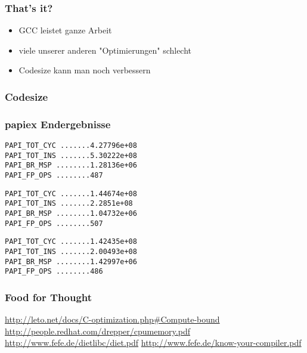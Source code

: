 \documentclass{beamer}[20pt]
\begin{document}
\begin{frame}
    \frametitle{That's it?}
        \begin{itemize}
            \item GCC leistet ganze Arbeit
            \item viele unserer anderen "Optimierungen" schlecht
            \item Codesize kann man noch verbessern
        \end{itemize}
\end{frame}

\begin{frame}
    \frametitle{Codesize}
    \begin{center}
    \end{center}
\end{frame}

\begin{frame}[fragile]
\frametitle{papiex Endergebnisse}

\begin{lstlisting}[caption="Ursprung", captionpos=b]
PAPI_TOT_CYC .......4.27796e+08
PAPI_TOT_INS .......5.30222e+08
PAPI_BR_MSP ........1.28136e+06
PAPI_FP_OPS ........487
\end{lstlisting}

\begin{lstlisting}[caption="Ursprung -O3", captionpos=b]
PAPI_TOT_CYC .......1.44674e+08
PAPI_TOT_INS .......2.2851e+08
PAPI_BR_MSP ........1.04732e+06
PAPI_FP_OPS ........507
\end{lstlisting}

\begin{lstlisting}[caption="Endergebnis", captionpos=b]
PAPI_TOT_CYC .......1.42435e+08
PAPI_TOT_INS .......2.00493e+08
PAPI_BR_MSP ........1.42997e+06
PAPI_FP_OPS ........486
\end{lstlisting}
\end{frame}

\begin{frame}
    \frametitle{Food for Thought}
    \url{http://leto.net/docs/C-optimization.php\#Compute-bound}
    \url{http://people.redhat.com/drepper/cpumemory.pdf}
    \url{http://www.fefe.de/dietlibc/diet.pdf}
    \url{http://www.fefe.de/know-your-compiler.pdf}
\end{frame}
\end{document}
